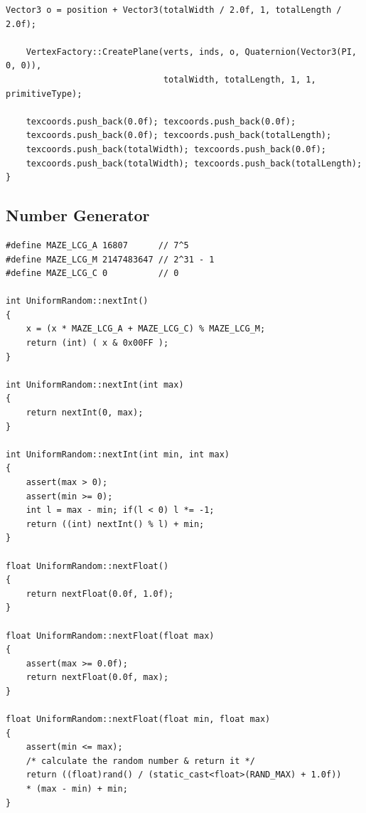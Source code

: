 \begin{lstlisting}[caption= The \texttt{BasicMeshMaker} class]
    Vector3 o = position + Vector3(totalWidth / 2.0f, 1, totalLength / 2.0f);
    
    VertexFactory::CreatePlane(verts, inds, o, Quaternion(Vector3(PI, 0, 0)),
                               totalWidth, totalLength, 1, 1, primitiveType);
    
    texcoords.push_back(0.0f); texcoords.push_back(0.0f);
    texcoords.push_back(0.0f); texcoords.push_back(totalLength);
    texcoords.push_back(totalWidth); texcoords.push_back(0.0f);
    texcoords.push_back(totalWidth); texcoords.push_back(totalLength);
}
\end{lstlisting}

\subsection{Number Generator}
\lstCpp
\begin{lstlisting}
#define MAZE_LCG_A 16807      // 7^5
#define MAZE_LCG_M 2147483647 // 2^31 - 1
#define MAZE_LCG_C 0          // 0

int UniformRandom::nextInt()
{
    x = (x * MAZE_LCG_A + MAZE_LCG_C) % MAZE_LCG_M;
    return (int) ( x & 0x00FF );
}

int UniformRandom::nextInt(int max)
{
    return nextInt(0, max);
}

int UniformRandom::nextInt(int min, int max)
{
    assert(max > 0);
    assert(min >= 0);
    int l = max - min; if(l < 0) l *= -1;
    return ((int) nextInt() % l) + min;
}

float UniformRandom::nextFloat()
{
    return nextFloat(0.0f, 1.0f);
}

float UniformRandom::nextFloat(float max)
{
    assert(max >= 0.0f);
    return nextFloat(0.0f, max);
}

float UniformRandom::nextFloat(float min, float max)
{
    assert(min <= max);
    /* calculate the random number & return it */
	return ((float)rand() / (static_cast<float>(RAND_MAX) + 1.0f))
	* (max - min) + min;
}
\end{lstlisting}


